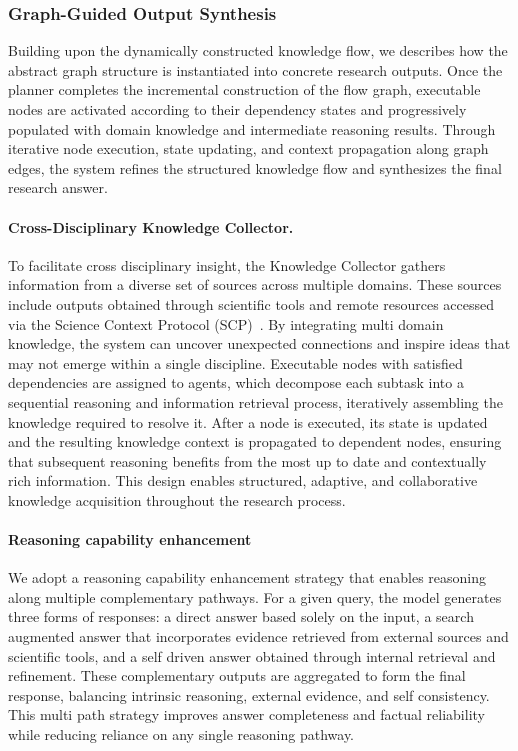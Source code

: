\subsubsection{Graph-Guided Output Synthesis}
Building upon the dynamically constructed knowledge flow, we describes how the abstract graph structure is instantiated into concrete research outputs. Once the planner completes the incremental construction of the flow graph, executable nodes are activated according to their dependency states and progressively populated with domain knowledge and intermediate reasoning results. Through iterative node execution, state updating, and context propagation along graph edges, the system refines the structured knowledge flow and synthesizes the final research answer.

\paragraph{Cross-Disciplinary Knowledge Collector.}
To facilitate cross disciplinary insight, the Knowledge Collector gathers information from a diverse set of sources across multiple domains. These sources include outputs obtained through scientific tools and remote resources accessed via the Science Context Protocol (SCP)~\citep{jiang2025scp}. By integrating multi domain knowledge, the system can uncover unexpected connections and inspire ideas that may not emerge within a single discipline. Executable nodes with satisfied dependencies are assigned to agents, which decompose each subtask into a sequential reasoning and information retrieval process, iteratively assembling the knowledge required to resolve it. After a node is executed, its state is updated and the resulting knowledge context is propagated to dependent nodes, ensuring that subsequent reasoning benefits from the most up to date and contextually rich information. This design enables structured, adaptive, and collaborative knowledge acquisition throughout the research process.

\paragraph{Reasoning capability enhancement}
We adopt a reasoning capability enhancement strategy that enables reasoning along multiple complementary pathways. For a given query, the model generates three forms of responses: a direct answer based solely on the input, a search augmented answer that incorporates evidence retrieved from external sources and scientific tools, and a self driven answer obtained through internal retrieval and refinement. These complementary outputs are aggregated to form the final response, balancing intrinsic reasoning, external evidence, and self consistency. This multi path strategy improves answer completeness and factual reliability while reducing reliance on any single reasoning pathway.


